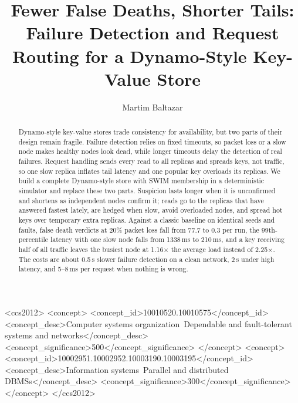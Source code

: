\documentclass[sigconf,nonacm]{acmart}
\begin{document}
\title{Fewer False Deaths, Shorter Tails: Failure Detection and Request Routing for a Dynamo-Style Key-Value Store}

\author{Martim Baltazar}

\renewcommand{\shortauthors}{Martim Baltazar}

\begin{abstract}
Dynamo-style key-value stores trade consistency for availability, but two parts of their design remain fragile. Failure detection relies on fixed timeouts, so packet loss or a slow node makes healthy nodes look dead, while longer timeouts delay the detection of real failures. Request handling sends every read to all replicas and spreads keys, not traffic, so one slow replica inflates tail latency and one popular key overloads its replicas. We build a complete Dynamo-style store with SWIM membership in a deterministic simulator and replace these two parts. Suspicion lasts longer when it is unconfirmed and shortens as independent nodes confirm it; reads go to the replicas that have answered fastest lately, are hedged when slow, avoid overloaded nodes, and spread hot keys over temporary extra replicas. Against a classic baseline on identical seeds and faults, false death verdicts at 20\% packet loss fall from 77.7 to 0.3 per run, the 99th-percentile latency with one slow node falls from 1338\,ms to 210\,ms, and a key receiving half of all traffic leaves the busiest node at 1.16$\times$ the average load instead of 2.25$\times$. The costs are about 0.5\,s slower failure detection on a clean network, 2\,s under high latency, and 5--8\,ms per request when nothing is wrong.
\end{abstract}

\begin{CCSXML}
<ccs2012>
<concept>
<concept_id>10010520.10010575</concept_id>
<concept_desc>Computer systems organization~Dependable and fault-tolerant systems and networks</concept_desc>
<concept_significance>500</concept_significance>
</concept>
<concept>
<concept_id>10002951.10002952.10003190.10003195</concept_id>
<concept_desc>Information systems~Parallel and distributed DBMSs</concept_desc>
<concept_significance>300</concept_significance>
</concept>
</ccs2012>
\end{CCSXML}


\end{document}
